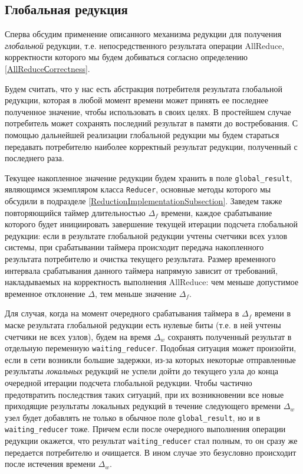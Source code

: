 \documentclass{article}
\theoremstyle{plain}
\theoremstyle{plain}
\theoremstyle{plain}
\theoremstyle{plain}
\theoremstyle{definition}
\theoremstyle{remark}
\theoremstyle{plain}
\begin{document}
\subsection{Глобальная редукция}
\label{GlobalReductionsSubection}

Сперва обсудим применение описанного механизма редукции для получения \textit{глобальной} редукции, т.е. непосредственного результата операции AllReduce, корректности которого мы будем добиваться согласно определению \ref{AllReduceСorrectness}.

Будем считать, что у нас есть абстракция потребителя результата глобальной редукции, которая в любой момент времени может принять ее последнее полученное значение, чтобы использовать в своих целях. В простейшем случае потребитель может сохранять последний результат в памяти до востребования. С помощью дальнейшей реализации глобальной редукции мы будем стараться передавать потребителю наиболее корректный результат редукции, полученный с последнего раза.

Текущее накопленное значение редукции будем хранить в поле \texttt{global\_result}, являющимся экземпляром класса \texttt{Reducer}, основные методы которого мы обсудили в подразделе \ref{ReductionImplementationSubsection}. Заведем также повторяющийся таймер длительностью $\Delta_f$ времени, каждое срабатывание которого будет инициировать завершение текущей итерации подсчета глобальной редукции: если в результате глобальной редукции учтены счетчики всех узлов системы, при срабатывании таймера происходит передача накопленного результата потребителю и очистка текущего результата. Размер временного интервала срабатывания данного таймера напрямую зависит от требований, накладываемых на корректность выполнения AllReduce: чем меньше допустимое временное отклонение $\Delta$, тем меньше значение $\Delta_f$.

Для случая, когда на момент очередного срабатывания таймера в $\Delta_f$ времени в маске результата глобальной редукции есть нулевые биты (т.е. в ней учтены счетчики не всех узлов), будем на время $\Delta_w$ сохранять полученный результат в отдельную переменную \texttt{waiting\_reducer}. Подобная ситуация может произойти, если в сети возникли большие задержки, из-за которых некоторые отправленные результаты \textit{локальных} редукций не успели дойти до текущего узла до конца очередной итерации подсчета глобальной редукции. Чтобы частично предотвратить последствия таких ситуаций, при их возникновении все новые приходящие результаты локальных редукций в течение следующего времени $\Delta_w$ узел будет добавлять не только в обычное поле \texttt{global\_result}, но и в \texttt{waiting\_reducer} тоже. Причем если после очередного выполнения операции редукции окажется, что результат \texttt{waiting\_reducer} стал полным, то он сразу же передается потребителю и очищается. В ином случае это безусловно происходит после истечения времени $\Delta_w$.
\end{document}
